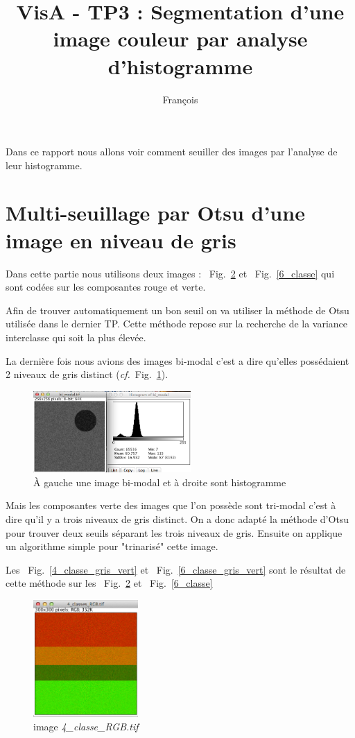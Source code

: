 \documentclass[a4paper,10pt]{article}
\title{VisA - TP3 : Segmentation d'une image couleur par analyse d'histogramme}
\author{Fran\c cois \bsc{Lepan}}
\begin{document}
\maketitle

Dans ce rapport nous allons voir comment seuiller des images par l'analyse de leur histogramme.

\section{Multi-seuillage par Otsu d'une image en niveau de gris}

Dans cette partie nous utilisons deux images :  ~Fig.~\ref{4_classe} et ~Fig.~\ref{6_classe} qui sont cod\'ees sur les composantes rouge et verte.

Afin de trouver automatiquement un bon seuil on va utiliser la m\'ethode de Otsu utilis\'ee dans le dernier TP. Cette m\'ethode repose sur la recherche de la variance interclasse qui soit la plus \'elev\'ee. 

La derni\`ere fois nous avions des images bi-modal c'est a dire qu'elles poss\'edaient 2 niveaux de gris distinct (\emph{cf.}~Fig.~\ref{histo_bi_modal}).

\begin{figure}[ht]
\begin{center}
	\includegraphics[width=6cm]{images/histogramme_bi_modal}
\end{center}
	\caption{\`A gauche une image bi-modal et \`a droite sont histogramme}
	\label{histo_bi_modal}
\end{figure}

Mais les composantes verte des images que l'on poss\`ede sont tri-modal c'est \`a dire qu'il y a trois niveaux de gris distinct. On a donc adapt\'e la m\'ethode d'Otsu pour trouver deux seuils s\'eparant les trois niveaux de gris. Ensuite on applique un algorithme simple pour "trinaris\'e" cette image. 

Les  ~Fig.~\ref{4_classe_gris_vert} et ~Fig.~\ref{6_classe_gris_vert} sont le r\'esultat de cette m\'ethode sur les ~Fig.~\ref{4_classe} et ~Fig.~\ref{6_classe}

\begin{figure}
\begin{center}
	\includegraphics[width=4cm]{images/4_classe}
\end{center}
	\caption{image \emph{4\_classe\_RGB.tif}}
	\label{4_classe}
\end{figure}
\end{document}
